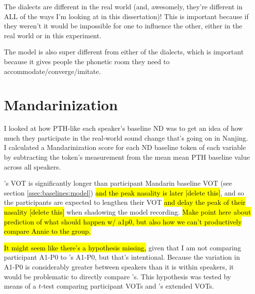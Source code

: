 The dialects are different in the real world (and, awesomely, they're different in ALL of the ways I'm looking at in this dissertation)! This is important because if they weren't it would be impossible for one to influence the other, either in the real world or in this experiment.

The model is also super different from either of the dialects, which is important because it gives people the phonetic room they need to accommodate/converge/imitate.

\section{Mandarinization}

I looked at how PTH-like each speaker's baseline ND was to get an idea of how much they participate in the real-world sound change that's going on in Nanjing. I calculated a Mandarinization score for each ND baseline token of each variable by subtracting the token's measurement from the mean mean PTH baseline value across all speakers.

\Annie{}'s VOT is significantly longer than participant Mandarin baseline VOT %
(see section \ref{ssec:baselines:model}) \hl{and the peak nasality is later [delete this]}, and so the participants are expected to lengthen their VOT \hl{and delay the peak of their nasality [delete this]} when shadowing the model recording. \hl{Make point here about prediction of what should happen w/ a1p0, but also how we can't productively compare Annie to the group.}


\hl{It might seem like there's a hypothesis missing,} given that I am not comparing participant A1-P0 to \annie{}'s A1-P0, but that's intentional. Because the variation in A1-P0 is considerably greater between speakers than it is within speakers, it would be problematic to directly compare \annie{}'s. This hypothesis was tested by means of a $t$-test comparing participant VOTs and \annie{}'s extended VOTs. 


\pagebreak
